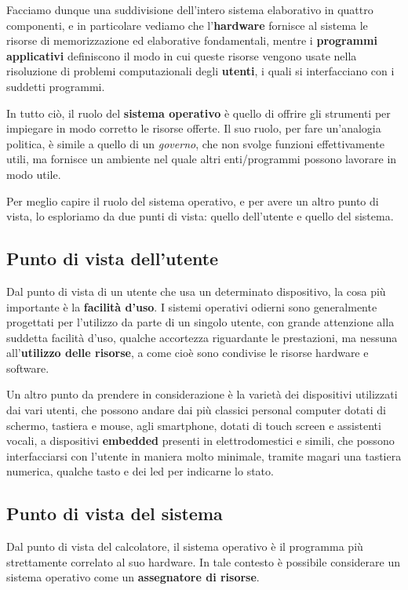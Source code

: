     Facciamo dunque una suddivisione dell'intero sistema elaborativo in quattro componenti, e in particolare vediamo che l'\textbf{hardware} fornisce al sistema le risorse di memorizzazione ed elaborative fondamentali, mentre i \textbf{programmi applicativi} definiscono il modo in cui queste risorse vengono usate nella risoluzione di problemi computazionali degli \textbf{utenti}, i quali si interfacciano con i suddetti programmi. 
    
    In tutto ciò, il ruolo del \textbf{sistema operativo} è quello di offrire gli strumenti per impiegare in modo corretto le risorse offerte. Il suo ruolo, per fare un'analogia politica, è simile a quello di un \textit{governo}, che non svolge funzioni effettivamente utili, ma fornisce un ambiente nel quale altri enti/programmi possono lavorare in modo utile.
    
    Per meglio capire il ruolo del sistema operativo, e per avere un altro punto di vista, lo esploriamo da due punti di vista: quello dell'utente e quello del sistema.
    
    \subsection{Punto di vista dell'utente}
        Dal punto di vista di un utente che usa un determinato dispositivo, la cosa più importante è la \textbf{facilità d'uso}. I sistemi operativi odierni sono generalmente progettati per l'utilizzo da parte di un singolo utente, con grande attenzione alla suddetta facilità d'uso, qualche accortezza riguardante le prestazioni, ma nessuna all'\textbf{utilizzo delle risorse}, a come cioè sono condivise le risorse hardware e software.
        
        Un altro punto da prendere in considerazione è la varietà dei dispositivi utilizzati dai vari utenti, che possono andare dai più classici personal computer dotati di schermo, tastiera e mouse, agli smartphone, dotati di touch screen e assistenti vocali, a dispositivi \textbf{embedded} presenti in elettrodomestici e simili, che possono interfacciarsi con l'utente in maniera molto minimale, tramite magari una tastiera numerica, qualche tasto e dei led per indicarne lo stato.
        
    \subsection{Punto di vista del sistema}
        Dal punto di vista del calcolatore, il sistema operativo è il programma più strettamente correlato al suo hardware. In tale contesto è possibile considerare un sistema operativo come un \textbf{assegnatore di risorse}.
        
